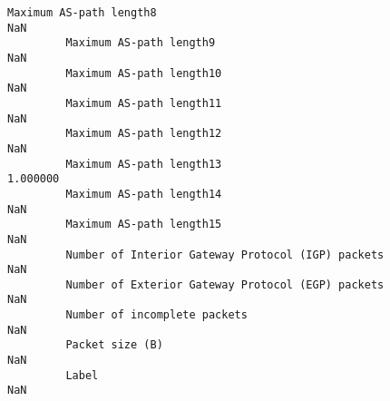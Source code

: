 \documentclass[11pt]{article}
\begin{document}
\begin{Verbatim}[commandchars=\\\{\}]
         Maximum AS-path length8                                                 NaN   
         Maximum AS-path length9                                                 NaN   
         Maximum AS-path length10                                                NaN   
         Maximum AS-path length11                                                NaN   
         Maximum AS-path length12                                                NaN   
         Maximum AS-path length13                                           1.000000   
         Maximum AS-path length14                                                NaN   
         Maximum AS-path length15                                                NaN   
         Number of Interior Gateway Protocol (IGP) packets                       NaN   
         Number of Exterior Gateway Protocol (EGP) packets                       NaN   
         Number of incomplete packets                                            NaN   
         Packet size (B)                                                         NaN   
         Label                                                                   NaN   
         

\end{Verbatim}
\end{document}
